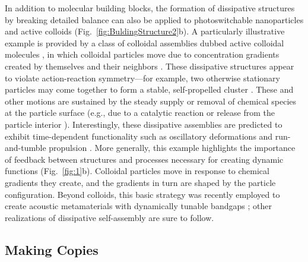 \begin{appendices}
In addition to molecular building blocks, the formation of dissipative structures by breaking detailed balance can also be applied to photoswitchable nanoparticles \cite{klajn2007light, kundu2015light, manna2015orthogonal, he2016light} and active colloids \cite{Soto2014, soto2015self, Niu2017, Singh2017, Schmidt2018} (Fig.~\ref{fig:BuldingStructure2}b). A particularly illustrative example is provided by a class of colloidal assemblies dubbed active colloidal molecules \cite{Lowen2018}, in which colloidal particles move due to concentration gradients created by themselves and their neighbors \cite{Soto2014}.  These dissipative structures appear to violate action-reaction symmetry---for example, two otherwise stationary particles may come together to form a stable, self-propelled cluster \cite{Soto2014}.  These and other motions are sustained by the steady supply or removal of chemical species at the particle surface (e.g., due to a catalytic reaction \cite{Singh2017} or release from the particle interior \cite{Niu2017}).  Interestingly, these dissipative assemblies are predicted to exhibit time-dependent functionality such as oscillatory deformations and run-and-tumble propulsion \cite{soto2015self}.  More generally, this example highlights the importance of feedback between structures and processes necessary for creating dynamic functions (Fig.~\ref{fig:1}b). Colloidal particles move in response to chemical gradients they create, and the gradients in turn are shaped by the particle configuration.  Beyond colloids, this basic strategy was recently employed to create acoustic metamaterials with dynamically tunable bandgaps \cite{bachelard2017emergence, bishop2017acoustic}; other realizations of dissipative self-assembly are sure to follow. 

\subsection{Making Copies}


\end{appendices}

